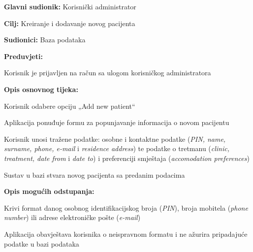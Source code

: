 					\noindent {}
					\begin{packed_item}
						\item \textbf{Glavni sudionik:} Korisnički administrator
						\item  \textbf{Cilj:} Kreiranje i dodavanje novog pacijenta
						\item  \textbf{Sudionici:} Baza podataka
						\item  \textbf{Preduvjeti:}
						\item[] \begin{packed_enum}
							\item Korisnik je prijavljen na račun sa ulogom korisničkog administratora
						\end{packed_enum}
						
						\item  \textbf{Opis osnovnog tijeka:}
						\item[] \begin{packed_enum}
							\item Korisnik odabere opciju „Add new patient“
							\item Aplikacija ponuđuje formu za popunjavanje informacija o novom pacijentu
							\item Korisnik unosi tražene podatke: osobne i kontaktne podatke (\textit{PIN, name, surname, phone, e-mail} i \textit{residence address}) te podatke o tretmanu (\textit{clinic, treatment, date from} i \textit{date to}) i preferenciji smještaja (\textit{accomodation preferences})
							\item Sustav u bazi stvara novog pacijenta sa predanim podacima
						\end{packed_enum}
						
						\item  \textbf{Opis mogućih odstupanja:}
						\item[] \begin{packed_item}
							\item[3.a] Krivi format danog osobnog identifikacijskog broja (\textit{PIN}), broja mobitela (\textit{phone number}) ili adrese elektroničke pošte (\textit{e-mail})
							\item[] \begin{packed_enum}
								\item Aplikacija obavještava korisnika o neispravnom formatu i ne ažurira pripadajuće podatke u bazi podataka
							\end{packed_enum}
						\end{packed_item}
					\end{packed_item}
					
